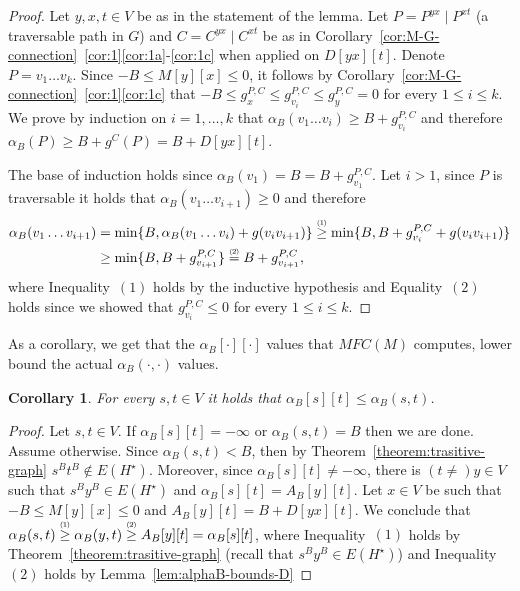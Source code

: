 \documentclass[11pt]{article}
\newtheorem{corollary}[theorem]{Corollary}
\newcommand\numeq[1]{\stackrel{\scriptscriptstyle(\mkern-1.5mu#1\mkern-1.5mu)}{=}}
\newcommand\numge[1]{\stackrel{\scriptscriptstyle(\mkern-1.5mu#1\mkern-1.5mu)}{\ge}}
\begin{document}
\begin{proof}
    Let $y,x,t\in V$ be as in the statement of the lemma. Let $P=P^{yx}\mid P^{xt}$
    (a traversable path in $G$) and $C= C^{yx}\mid C^{xt}$ be as in Corollary~\ref{cor:M-G-connection}~\ref{cor:1}\ref{cor:1a}-\ref{cor:1c} when applied on $D[yx][t]$. Denote $P = v_1\ldots v_k$. Since $-B \le M[y][x]\le 0$, it follows by Corollary~\ref{cor:M-G-connection}~\ref{cor:1}\ref{cor:1c} that   $-B\le g^{P,C}_x \le g^{P,C}_{v_i}\le g^{P,C}_y= 0$ for every $1\le i \le k$. We prove by induction on $i=1,\ldots, k$ that $\alpha_B(v_1 \ldots v_i) \ge B +  g^{P,C}_{v_i}$ and therefore $\alpha_B(P) \ge B +  g^C(P)=B + D[yx][t]$. 

    The base of induction holds since 
    $\alpha_B(v_1)=B= B+ g^{P,C}_{v_1}$. Let $i>1$, since $P$ is traversable it holds that $\alpha_B(v_1\ldots v_{i+1})\ge 0$ and therefore 
    \begin{align*}
    \alpha_B(v_1\ldots v_{i+1}) 
    &= \min \{B , \alpha_B(v_1 \ldots v_i) + g(v_i v_{i+1}) \}
     \numge{1} 
    \min \{B , B + g^{P,C}_{v_i} + g(v_i v_{i+1}) \} \\
    &\ge  \min \{B , B + g^{P,C}_{v_{i+1}}  \} 
    \numeq{2} B +  g^{P,C}_{v_{i+1}},
    \end{align*}
     where Inequality~$(1)$ holds by the inductive hypothesis and Equality~$(2)$ holds since we showed that $g^{P,C}_{v_i}\le 0$ for every $1\le i \le k$.
\end{proof}

As a corollary, we get that the $\alpha_B[\cdot][\cdot]$ values that $MFC(M)$ computes, lower bound the actual $\alpha_B(\cdot,\cdot)$ values.

\begin{corollary}\label{cor:A_lowerbounds_alpha}
    For every $s,t\in V$ it holds that $\alpha_B[s][t] \le \alpha_B(s,t)$.
\end{corollary}

\begin{proof}
    Let $s,t\in V$. If $\alpha_B[s][t] = -\infty$ or $\alpha_B(s,t)=B$ then we are done. Assume otherwise. Since $\alpha_B(s,t) < B$, then by Theorem~\ref{theorem:trasitive-graph} 
    $s^B t^B \notin E(H^\star)$. Moreover, since $\alpha_B[s][t] \neq -\infty$, there is $(t\neq )y\in V$ such that $s^B y^B \in E(H^\star)$ and $\alpha_B[s][t] = A_B[y][t]$. 
    Let $x\in V$ be such that $-B\le M[y][x]\le 0$ and $A_B[y][t] = B + D[yx][t]$. We conclude that $\alpha_B(s,t) \numge{1} \alpha_B(y,t) \numge{2} A_B[y][t] = \alpha_B[s][t]$, where Inequality~$(1)$ holds by Theorem~\ref{theorem:trasitive-graph} (recall that $s^B y^B \in E(H^\star)$) and Inequality~$(2)$ holds by Lemma~\ref{lem:alphaB-bounds-D}  
\end{proof}
\end{document}
